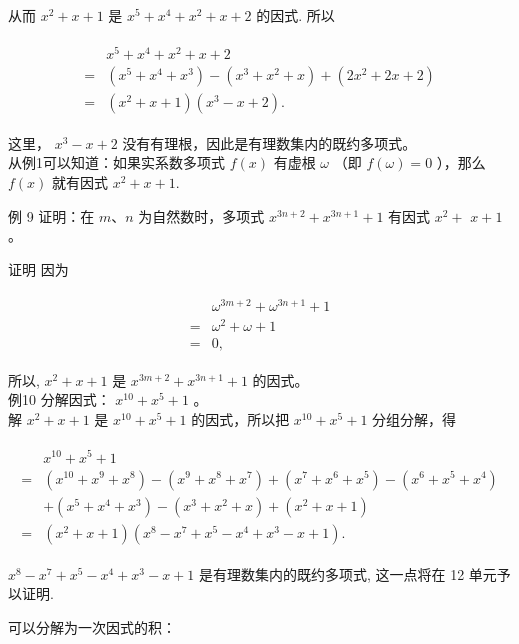 \documentclass[10pt]{article}
\begin{document}
从而 $x^{2}+x+1$ 是 $x^{5}+x^{4}+x^{2}+x+2$ 的因式. 所以

\begin{align*}
\begin{aligned}
& x^{5}+x^{4}+x^{2}+x+2 \\
= & \left(x^{5}+x^{4}+x^{3}\right)-\left(x^{3}+x^{2}+x\right)+\left(2 x^{2}+2 x+2\right) \\
= & \left(x^{2}+x+1\right)\left(x^{3}-x+2\right) .
\end{aligned}
\end{align*}

这里， $x^{3}-x+2$ 没有有理根，因此是有理数集内的既约多项式。\\
从例1可以知道：如果实系数多项式 $f(x)$ 有虚根 $\omega$ （即 $f(\omega)=0$ ），那么 $f(x)$ 就有因式 $x^{2}+x+1$.

例 9 证明：在 $m 、 n$ 为自然数时，多项式 $x^{3 n+2}+x^{3 n+1}+1$ 有因式 $x^{2}+$ $x+1$ 。

证明 因为

\begin{align*}
\begin{aligned}
& \omega^{3 m+2}+\omega^{3 n+1}+1 \\
= & \omega^{2}+\omega+1 \\
= & 0,
\end{aligned}
\end{align*}

所以, $x^{2}+x+1$ 是 $x^{3 m+2}+x^{3 n+1}+1$ 的因式。\\
例10 分解因式： $x^{10}+x^{5}+1$ 。\\
解 $x^{2}+x+1$ 是 $x^{10}+x^{5}+1$ 的因式，所以把 $x^{10}+x^{5}+1$ 分组分解，得

\begin{align*}
\begin{aligned}
& x^{10}+x^{5}+1 \\
= & \left(x^{10}+x^{9}+x^{8}\right)-\left(x^{9}+x^{8}+x^{7}\right)+\left(x^{7}+x^{6}+x^{5}\right)-\left(x^{6}+x^{5}+x^{4}\right) \\
& +\left(x^{5}+x^{4}+x^{3}\right)-\left(x^{3}+x^{2}+x\right)+\left(x^{2}+x+1\right) \\
= & \left(x^{2}+x+1\right)\left(x^{8}-x^{7}+x^{5}-x^{4}+x^{3}-x+1\right) .
\end{aligned}
\end{align*}

$x^{8}-x^{7}+x^{5}-x^{4}+x^{3}-x+1$ 是有理数集内的既约多项式, 这一点将在 12 单元予以证明.

可以分解为一次因式的积：
\end{document}
